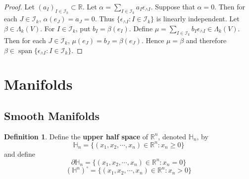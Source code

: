 \documentclass[12pt]{amsart}
\theoremstyle{definition}
\newtheorem{defn}[definition]{Definition}
\theoremstyle{definition}
\newcommand{\al}{\alpha}
\newcommand{\bet}{\beta}
\newcommand{\Lam}{\Lambda}
\newcommand{\ep}{\epsilon}
\renewcommand{\H}{\mathbb{H}}
\newcommand{\R}{\mathbb{R}}
\newcommand{\MI}{\mathcal{I}}
\DeclareMathOperator{\spn}{span}
\begin{document}
	\begin{proof}
		Let $(a_I)_{I \in \MI_k} \subset \R$. Let $\al = \sum\limits_{I \in \MI_k}a_I \ep_{\wedge I} $. Suppose that $\al = 0$. Then for each $J \in \MI_k$, $\al(e_J) = a_J = 0$. Thus $\{\ep_{\wedge I} : I \in \MI_k\}$ is linearly independent. Let $\bet \in \Lam_k(V)$. For $I \in \MI_k$, put $b_I = \bet(e_I)$. Define $\mu = \sum\limits_{I \in \MI_k} b_I\ep_{\wedge I} \in \Lam_k(V)$. Then for each $J \in \MI_k$, $\mu(e_J) = b_J = \bet(e_J)$. Hence $\mu = \bet$ and therefore $\bet \in \spn \{\ep_{\wedge I} :I \in \MI_k\}$.
	\end{proof}
	
	
	
	
	
	
	
	
	
	
	
	
	
	
	
	
	
	
	
	
	
	
	
	
	
	
	
	
	
	
	
	
	
	
	
	
	
	
	

	\newpage
	
	\section{Manifolds}
	
	\subsection{Smooth Manifolds}
	
	\begin{defn}
		Define the \textbf{upper half space} of $\R^n$, denoted $\H_n$, by $$\H_n = \{(x_1, x_2, \cdots, x_n) \in \R^n: x_n \geq 0\}$$ and define $$\partial\H_n = \{(x_1, x_2, \cdots, x_n) \in \R^n: x_n = 0\}$$ 
		$$(\H^n)^{\circ} = \{(x_1, x_2, \cdots, x_n) \in \R^n: x_n > 0\}$$
	\end{defn}
	
\end{document}
